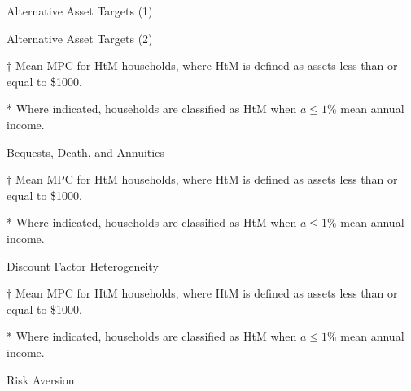 \documentclass[9pt]{extarticle}
\begin{document}
\begin{table}[h]
\caption{Alternative Asset Targets (1)}
\begin{threeparttable}
\centering


\begin{table}[h]
\caption{Alternative Asset Targets (2)}
\begin{threeparttable}
\centering



\begin{tablenotes}
	\item[$\dagger$] Mean MPC for HtM households, where HtM is defined as assets less than or equal to \$1000.
	\item[*] Where indicated, households are classified as HtM when $a \leq 1\%$ mean annual income.
\end{tablenotes}
\end{threeparttable}
\end{table}

\begin{table}[h]
\caption{Bequests, Death, and Annuities}
\begin{threeparttable}
\centering


\begin{tablenotes}
	\item[$\dagger$] Mean MPC for HtM households, where HtM is defined as assets less than or equal to \$1000.
	\item[*] Where indicated, households are classified as HtM when $a \leq 1\%$ mean annual income.
\end{tablenotes}
\end{threeparttable}
\end{table}

\begin{table}[h]
\caption{Discount Factor Heterogeneity}
\begin{threeparttable}
\centering


\begin{tablenotes}
	\item[$\dagger$] Mean MPC for HtM households, where HtM is defined as assets less than or equal to \$1000.
	\item[*] Where indicated, households are classified as HtM when $a \leq 1\%$ mean annual income.
\end{tablenotes}
\end{threeparttable}
\end{table}

\begin{table}[h]
\caption{Risk Aversion}
\begin{threeparttable}
\centering



\end{threeparttable}
\end{table}
\end{threeparttable}
\end{table}
\end{document}
